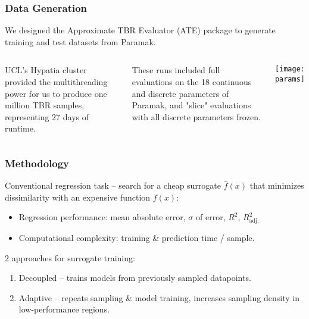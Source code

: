 \begin{frame}
	\frametitle{Data Generation}
	We designed the Approximate TBR Evaluator (ATE) package to generate training and test datasets from Paramak.\newline
	 \begin{columns}[onlytextwidth,T]
      \column{\dimexpr\linewidth-6cm-5mm}
        
        UCL's Hypatia cluster provided the multithreading power for us to produce one million TBR samples, representing 27 days of runtime.\newline
        
        These runs included full evaluations on the 18 continuous and discrete parameters of Paramak, and "slice" evaluations with all discrete parameters frozen.

      \column{6cm}
      \vspace{0cm}
      \texttt{[image: params]}

    \end{columns}
\end{frame}


\begin{frame}
	\frametitle{Methodology}
			Conventional regression task -- search for a cheap surrogate $\hat{f}(x)$ that
			minimizes dissimilarity with an expensive function $f(x)$:

			\begin{itemize}
				\item
					Regression performance: mean absolute error, $\sigma$ of
					error, $R^2$, $R^2_\text{adj.}$
				\item
					Computational complexity:
					training \& prediction time / sample.
			\end{itemize}

			2 approaches for surrogate training:
			\begin{enumerate}
				\item
					Decoupled -- trains models from previously sampled
					datapoints.
				\item
					Adaptive -- repeats sampling \& model training, increases
					sampling density in low-performance regions.
			\end{enumerate}
\end{frame}

